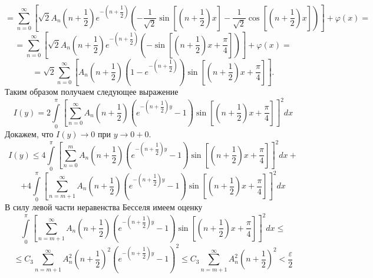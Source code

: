 \documentclass[12pt, a4paper]{article}
\begin{document}
	\begin{equation*}
		= \sum\limits_{n=0}^{\infty}  \left[ \sqrt{2}A_n \left(n + \dfrac12 \right)e^{-\left(n+\dfrac12\right)} \left(-\dfrac{1}{\sqrt{2}}\sin{\left[\left(n+\dfrac12\right)x\right]} - \dfrac{1}{\sqrt{2}}\cos{\left[\left(n+\dfrac12\right)x\right]} \right) \right] + \varphi(x) = 
	\end{equation*}
	\begin{equation*}
		= \sum\limits_{n=0}^{\infty}  \left[ \sqrt{2} A_n \left(n + \dfrac12 \right)e^{-\left(n+\dfrac12\right)} \left( -\sin{\left[\left(n + \dfrac12 \right)x  + \dfrac\pi4 \right]} \right) \right] + \varphi(x) = 
	\end{equation*}
	\begin{equation*}
		=  \sqrt{2} \sum\limits_{n=0}^{\infty}  \left[A_n \left(n + \dfrac12 \right) \left(1 - e^{-\left(n+\dfrac12\right)} \right) \sin{\left[\left(n + \dfrac12 \right)x  + \dfrac\pi4 \right]} \right].
	\end{equation*}
		Таким образом получаем следующее выражение
	\begin{equation*}
		I(y) =  2 \int\limits_0^\pi \left[	\sum\limits_{n=0}^{\infty} A_n\left(n+\dfrac12\right) \left( e^{-\left(n+\dfrac12\right)y} - 1\right) \sin{\left[\left(n+\dfrac12\right) x  + \dfrac\pi4\right]} \right]^2 dx
	\end{equation*}
	Докажем, что $I(y) \to 0$ при $y \to 0+0$. 
	\begin{equation*}
		I(y) \leq 4\int\limits_0^\pi \left[	\sum\limits_{n=0}^{m} A_n\left(n+\dfrac12\right) \left( e^{-\left(n+\dfrac12\right)y} - 1\right) \sin{\left[\left(n+\dfrac12\right) x  + \dfrac\pi4\right]} \right]^2 dx + 
	\end{equation*}
	\begin{equation*}
		+ 4\int\limits_0^\pi \left[	\sum\limits_{n=m+1}^{\infty} A_n\left(n+\dfrac12\right) \left( e^{-\left(n+\dfrac12\right)y} - 1\right) \sin{\left[\left(n+\dfrac12\right) x  + \dfrac\pi4\right]} \right]^2 dx
	\end{equation*}
	В силу левой части неравенства Бесселя имеем оценку
	\begin{equation*}
		\int\limits_0^\pi \left[	\sum\limits_{n=m+1}^{\infty} A_n\left(n+\dfrac12\right) \left( e^{-\left(n+\dfrac12\right)y} - 1\right) \sin{\left[\left(n+\dfrac12\right) x  + \dfrac\pi4\right]} \right]^2 dx \leq 
	\end{equation*}
	\begin{equation*}
		\leq  C_3 \sum\limits_{n=m+1}^{\infty} A_n^2 \left(n+\dfrac12\right)^2 \left(e^{-\left(n+\dfrac12\right)y} - 1\right)^2 \leq C_3 \sum\limits_{n=m+1}^{\infty} A_n^2 \left(n+\dfrac12\right)^2 < \dfrac{\varepsilon}{2}
	\end{equation*}
\end{document}
